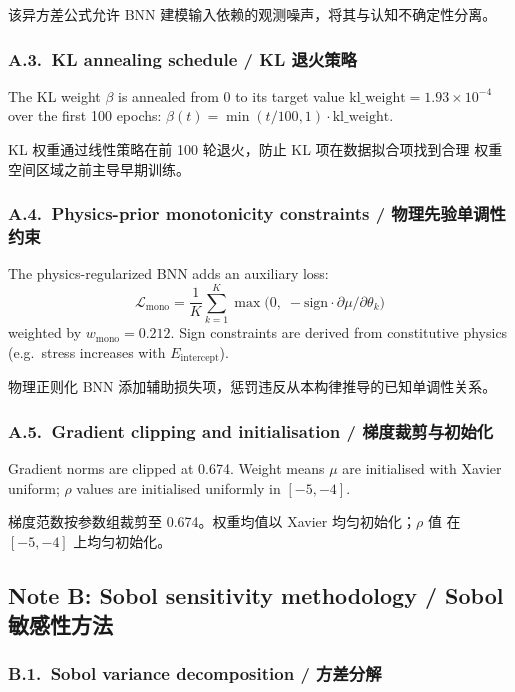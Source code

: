 \documentclass[11pt,a4paper]{article}
\newcommand{\Eint}{\ensuremath{E_{\mathrm{intercept}}}}
\begin{document}
该异方差公式允许 BNN 建模输入依赖的观测噪声，将其与认知不确定性分离。

\subsubsection*{A.3.~KL annealing schedule / KL 退火策略}

The KL weight $\beta$ is annealed from 0 to its target value
$\mathrm{kl\_weight} = 1.93\times10^{-4}$ over the first 100 epochs:
$\beta(t) = \min(t/100, 1) \cdot \mathrm{kl\_weight}$.

KL 权重通过线性策略在前 100 轮退火，防止 KL 项在数据拟合项找到合理
权重空间区域之前主导早期训练。

\subsubsection*{A.4.~Physics-prior monotonicity constraints / 物理先验单调性约束}

The physics-regularized BNN adds an auxiliary loss:
\begin{equation}
\mathcal{L}_\mathrm{mono}
= \frac{1}{K}\sum_{k=1}^{K}\max\bigl(0,\;
  -\mathrm{sign}\cdot\partial\mu/\partial\theta_k\bigr)
\end{equation}
weighted by $w_\mathrm{mono} = 0.212$. Sign constraints are derived
from constitutive physics (e.g.\ stress increases with \Eint{}).

物理正则化 BNN 添加辅助损失项，惩罚违反从本构律推导的已知单调性关系。

\subsubsection*{A.5.~Gradient clipping and initialisation / 梯度裁剪与初始化}

Gradient norms are clipped at 0.674. Weight means $\mu$ are initialised
with Xavier uniform; $\rho$ values are initialised uniformly in
$[-5, -4]$.

梯度范数按参数组裁剪至 0.674。权重均值以 Xavier 均匀初始化；$\rho$ 值
在 $[-5, -4]$ 上均匀初始化。


\subsection{Note B: Sobol sensitivity methodology / Sobol 敏感性方法}

\subsubsection*{B.1.~Sobol variance decomposition / 方差分解}
\end{document}
